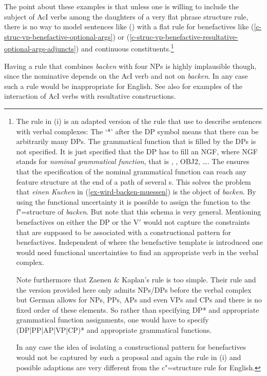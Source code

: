 The point about these examples is that unless one is willing to include the subject of AcI verbs
among the daughters of a very flat phrase structure rule, there is no way to model sentences like
() with a flat rule for benefactives like (\ref{c-struc-vp-benefactive-optional-args}) or
(\ref{c-struc-vp-benefactive-resultative-optional-args-adjuncts}) and continuous
constituents.\footnote{\label{fn-zk-rule}%
The rule in (i) is an adapted version of the rule that \citet[]{ZK2002a} use to
describe sentences with verbal complexes:
\ea
\label{lfg-vp-regel-zk}
\z
The `*' after the DP symbol means that there can be arbitrarily many DPs. The grammatical function
that is filled by the DPs is not specified. It is just specified that the DP has to fill an NGF,
where NGF stands for \emph{nominal grammatical function}, that is \subjlfg, \obj, OBJ2, \ldots. The
\comp* ensures that the specification of the nominal grammatical function can reach any feature
structure at the end of a path of several \comp{}s. This solves the problem that \emph{einen Kuchen}
in (\ref{ex-wird-backen-muessen}) is the object of \emph{backen}. By using the functional
uncertainty it is possible to assign the \obj function to the f"=structure of \emph{backen}. But
note that this schema is very general. Mentioning benefactives on either the DP or the V$'$ would
not capture the constraints that are supposed to be associated with a constructional pattern for
benefactives. Independent of where the benefactive template is introduced one would need functional
uncertainties to find an appropriate verb in the verbal complex. 

Note furthermore that Zaenen \& Kaplan's rule is too simple. Their rule and the version provided
here only admits NPs/DPs before the verbal complex but German allows for NPs, PPs, APs and even VPs
and CPs and there is no fixed order of these elements. So rather than specifying DP* and appropriate
grammatical function assignments, one would have to specify (DP|PP|AP|VP|CP)* and appropriate
grammatical functions.

In any case the idea of isolating a constructional pattern for benefactives would
not be captured by such a proposal and again the rule in (i) and possible adaptions are very different from the c"=structure
rule for English.
}


Having a rule that combines \emph{backen} with four NPs is 
highly implausible though, since the nominative depends on the AcI verb and not on \emph{backen}. In
any case such a rule would be inappropriate for English. See also  for examples of
the interaction of AcI verbs with resultative constructions.

